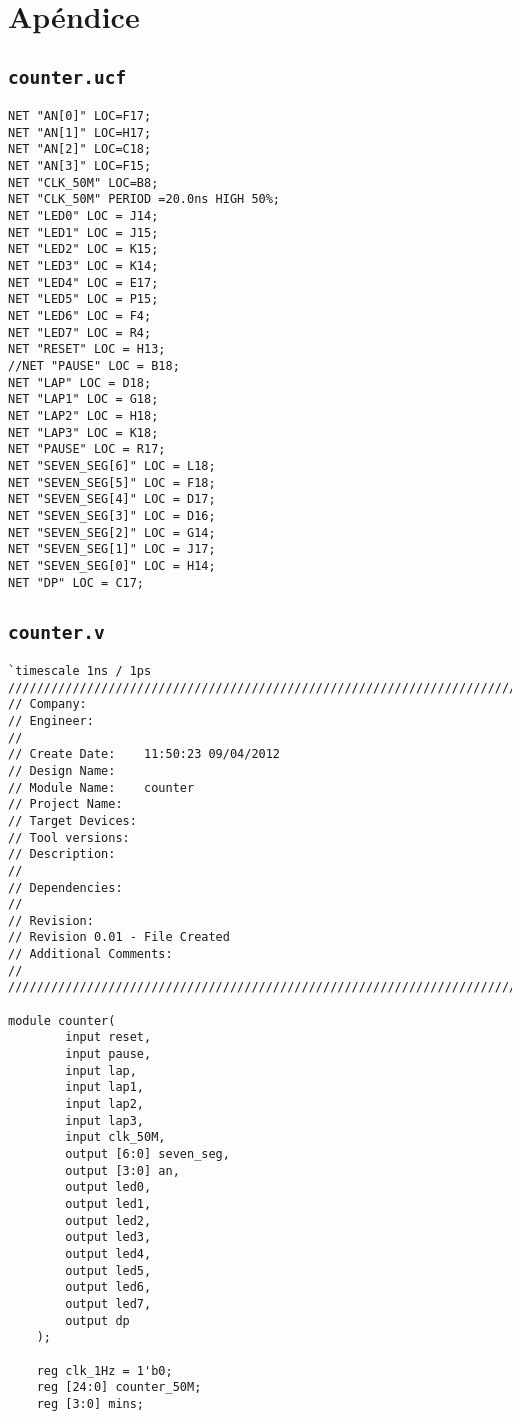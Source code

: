 \documentclass[a4paper,10pt]{article}
\begin{document}
\appendix
{\small {\small
\section{Apéndice}
\subsection{{\tt counter.ucf}}
\label{appendix:counter.ucf}
\begin{verbatim}
NET "AN[0]" LOC=F17;
NET "AN[1]" LOC=H17;
NET "AN[2]" LOC=C18;
NET "AN[3]" LOC=F15;
NET "CLK_50M" LOC=B8;
NET "CLK_50M" PERIOD =20.0ns HIGH 50%;
NET "LED0" LOC = J14;
NET "LED1" LOC = J15;
NET "LED2" LOC = K15;
NET "LED3" LOC = K14;
NET "LED4" LOC = E17;
NET "LED5" LOC = P15;
NET "LED6" LOC = F4;
NET "LED7" LOC = R4;
NET "RESET" LOC = H13;  
//NET "PAUSE" LOC = B18;
NET "LAP" LOC = D18;
NET "LAP1" LOC = G18;
NET "LAP2" LOC = H18;
NET "LAP3" LOC = K18;
NET "PAUSE" LOC = R17;
NET "SEVEN_SEG[6]" LOC = L18;
NET "SEVEN_SEG[5]" LOC = F18;
NET "SEVEN_SEG[4]" LOC = D17;
NET "SEVEN_SEG[3]" LOC = D16;
NET "SEVEN_SEG[2]" LOC = G14;
NET "SEVEN_SEG[1]" LOC = J17;
NET "SEVEN_SEG[0]" LOC = H14;
NET "DP" LOC = C17;
\end{verbatim}
\subsection{{\tt counter.v}}
\label{appendix:counter.v}
\begin{verbatim}
`timescale 1ns / 1ps
//////////////////////////////////////////////////////////////////////////////////
// Company: 
// Engineer: 
// 
// Create Date:    11:50:23 09/04/2012 
// Design Name: 
// Module Name:    counter 
// Project Name: 
// Target Devices: 
// Tool versions: 
// Description: 
//
// Dependencies: 
//
// Revision: 
// Revision 0.01 - File Created
// Additional Comments: 
//
//////////////////////////////////////////////////////////////////////////////////

module counter(
        input reset,
        input pause,
        input lap,
        input lap1,
        input lap2,
        input lap3,
        input clk_50M,
        output [6:0] seven_seg,
        output [3:0] an,
        output led0,
        output led1,
        output led2,
        output led3,
        output led4,
        output led5,
        output led6,
        output led7,
        output dp
    );

    reg clk_1Hz = 1'b0;
    reg [24:0] counter_50M;
    reg [3:0] mins;
    

\end{verbatim}}}
\end{document}
